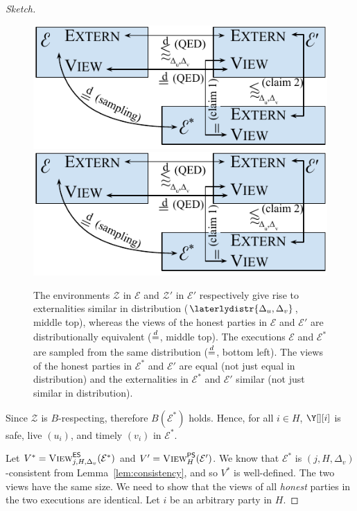 \begin{proof}[Sketch]
  \begin{figure}
    \centering
    \iftwocolumn
    \includegraphics[width=0.8 \columnwidth,keepaspectratio]{figures/rollerblade-emulation-distribution.pdf}
    \else
    \includegraphics[width=0.6 \columnwidth,keepaspectratio]{figures/rollerblade-emulation-distribution.pdf}
    \fi
    \caption{The environments $\mathcal{Z}$ in $\mathcal{E}$ and $\mathcal{Z}'$
    in $\mathcal{E}'$ respectively
    give rise to externalities similar in distribution ($\laterlydistr{\Delta_u,\Delta_v}$,
    middle top),
    whereas the views of the honest parties in $\mathcal{E}$
    and $\mathcal{E}'$ are distributionally equivalent ($\distreq$, middle top).
    The executions $\mathcal{E}$ and $\mathcal{E}^*$ are sampled
    from the same distribution ($\distreq$, bottom left).
    The views of the honest parties in $\mathcal{E}^*$ and $\mathcal{E}'$
    are equal (not just equal in distribution)
    and the externalities in $\mathcal{E}^*$ and $\mathcal{E}'$
    similar (not just similar in distribution).}
    \label{fig.emulation-distribution}
  \end{figure}

  Since $\mathcal{Z}$ is $B$-respecting, therefore $B(\mathcal{E}^*)$ holds.
  Hence, for all $i \in H$, $\Y[][i]$ is safe, live $(u_i)$, and timely $(v_i)$
  in $\mathcal{E}^*$.

  \myparagraph[Claim 1: $\LCView_{j,H,\Delta_v}(\mathcal{E}^*) = \PEView_H(\mathcal{E}')$]
  Let $V^* = \textsc{View}^{\textsf{ES}}_{j,H,\Delta_v}(\mathcal{E}^*)$ and
  $V' = \textsc{View}^{\textsf{PS}}_H(\mathcal{E}')$.
  We know that $\mathcal{E}^*$ is $(j, H, \Delta_v)$-consistent
  from Lemma~\ref{lem:consistency}, and so $V^*$
  is well-defined.
  The two views have the same size.
  We need to show
  that the views of all \emph{honest} parties in the two executions are identical.
  Let $i$ be an arbitrary party in $H$.


\end{proof}
